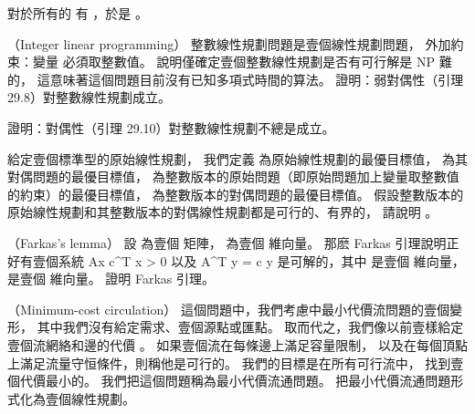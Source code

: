 \startigBase[continue]\startitem
對於所有的  有 ，於是 。
\stopitem\stopigBase
\stopitem\stopigBase

\startANSWER
{}
\stopANSWER

\stopPROBLEM

\startPROBLEM
（Integer linear programming）
{\EMP 整數線性規劃問題}是壹個線性規劃問題，
外加約束：變量  必須取整數值。
\inexercise[34.5-3] 說明僅確定壹個整數線性規劃是否有可行解是 NP 難的，
這意味著這個問題目前沒有已知多項式時間的算法。
\startigBase[a]\startitem
證明：弱對偶性（引理 29.8）對整數線性規劃成立。
\stopitem\stopigBase

\startANSWER
{}
\stopANSWER

\startigBase[continue]\startitem
證明：對偶性（引理 29.10）對整數線性規劃不總是成立。
\stopitem\stopigBase

\startANSWER
{}
\stopANSWER

\startigBase[continue]\startitem
給定壹個標準型的原始線性規劃，
我們定義  為原始線性規劃的最優目標值，
  為其對偶問題的最優目標值，
  為整數版本的原始問題（即原始問題加上變量取整數值的約束）的最優目標值，
  為整數版本的對偶問題的最優目標值。
假設整數版本的原始線性規劃和其整數版本的對偶線性規劃都是可行的、有界的，
請說明 。
\stopitem\stopigBase

\startANSWER
{}
\stopANSWER

\stopPROBLEM

\startPROBLEM
（Farkas’s lemma）
設  為壹個  矩陣，
  為壹個  維向量。
那麽 Farkas 引理說明正好有壹個系統
\startformula\startmathalignment
\NC Ax \NC {} \NR
\NC c^T x \NC > 0 \NR
\stopmathalignment\stopformula
以及
\startformula\startmathalignment
\NC A^T y \NC = c \NR
\NC     y \NC {} \NR
\stopmathalignment\stopformula
是可解的，其中  是壹個  維向量，
  是壹個  維向量。
證明 Farkas 引理。
\stopPROBLEM

\startANSWER
{}
\stopANSWER

\startPROBLEM
（Minimum-cost circulation）
這個問題中，我們考慮 中最小代價流問題的壹個變形，
其中我們沒有給定需求、壹個源點或匯點。
取而代之，我們像以前壹樣給定壹個流網絡和邊的代價 。
如果壹個流在每條邊上滿足容量限制，
以及在每個頂點上滿足流量守恒條件，則稱他是可行的。
我們的目標是在所有可行流中，
找到壹個代價最小的。
我們把這個問題稱為{\EMP 最小代價流通問題}。
\startigBase[a]\startitem
把最小代價流通問題形式化為壹個線性規劃。
\stopitem\stopigBase

